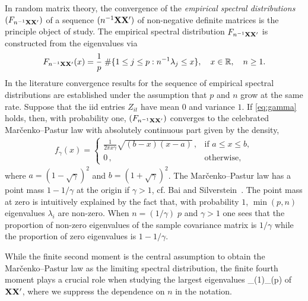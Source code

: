 In random matrix theory,  the convergence of the {\em empirical spectral distributions} $(F_{n^{-1}{\mathbf X} {\mathbf X}'})$ of a sequence $(n^{-1}{\mathbf X} {\mathbf X}')$ of non-negative definite matrices is the principle object of study. The empirical spectral distribution $F_{n^{-1}{\mathbf X} {\mathbf X}'}$ is constructed from the eigenvalues via
\begin{equation*}
F_{n^{-1}{\mathbf X} {\mathbf X}'}(x)= \frac{1}{p}\; \# \{ 1\le j\le p : n^{-1} \lambda_j \le x \}, \quad x\in \mathbb{R},\quad n\ge1.
\end{equation*}
In the literature convergence results for the sequence of empirical spectral distributions are established under the assumption that $p$ and $n$ grow at the same rate.
Suppose that the iid entries $Z_{it}$ have mean $0$ and variance $1$. If \eqref{eq:gamma} holds, then, with probability one, $(F_{n^{-1}{\mathbf X} {\mathbf X}'})$ converges to the celebrated Mar\v cenko--Pastur law with absolutely  continuous part given by the density,
\begin{eqnarray}\label{eq:MP}
f_\gamma(x) =
\left\{\begin{array}{cc}
\frac{1}{2\pi x\gamma} \sqrt{(b-x)(x-a)} \,, & \mbox{if } a\le x \le b, \\
 0 \,, & \mbox{otherwise,}
\end{array}\right.
\end{eqnarray}\noindent
where $a=(1-\sqrt{\gamma})^2$ and $b=(1+\sqrt{\gamma})^2$. The Mar\v cenko--Pastur law has a point mass $1-1/\gamma$ at the origin if $\gamma>1$, cf. Bai and Silverstein~\cite[Chapter~3]{bai:silverstein:2010}. The point mass at zero is intuitively explained by the fact that, with probability $1$, $\min(p,n)$ eigenvalues $\lambda_i$ are non-zero. When $n=(1/\gamma) \; p$ and $\gamma >1$ one sees that the proportion of non-zero eigenvalues of the sample covariance matrix is $1/\gamma$ while the proportion of zero eigenvalues is $1-1/\gamma$.

While the finite second moment is the central assumption to obtain the Mar\v cenko--Pastur law as the limiting spectral distribution, the finite fourth moment plays a crucial role when studying the largest eigenvalues
\beam\label{eq:order}
\la_{(1)}\ge \cdots \ge \la_{(p)}
\eeam
of ${\mathbf X}{\mathbf X}'$, where we suppress the dependence on $n$ in the notation.

